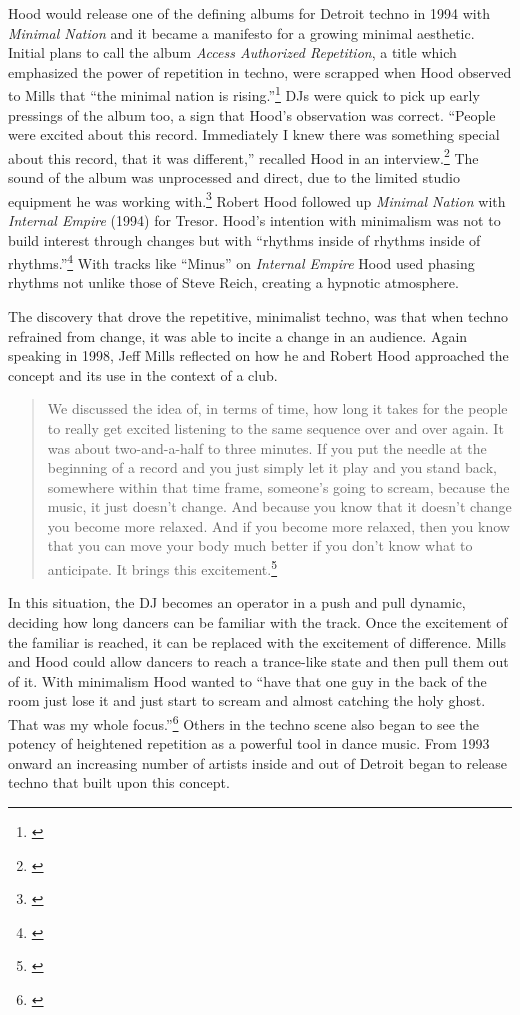 \documentclass[12pt,twoside]{reedthesis}
\begin{document}
Hood would release one of the defining albums for Detroit techno in 1994 with \emph{Minimal Nation} and it became a manifesto for a growing minimal aesthetic. Initial plans to call the album \emph{Access Authorized Repetition}, a title which emphasized the power of repetition in techno, were scrapped when Hood observed to Mills that ``the minimal nation is rising.''\footnote{\cite{holbenMakingMinimalNation2019}} DJs were quick to pick up early pressings of the album too, a sign that Hood's observation was correct. ``People were excited about this record. Immediately I knew there was something special about this record, that it was different,'' recalled Hood in an interview.\footnote{\cite{holbenMakingMinimalNation2019}} The sound of the album was unprocessed and direct, due to the limited studio equipment he was working with.\footnote{\cite{holbenMakingMinimalNation2019}} Robert Hood followed up \emph{Minimal Nation} with \emph{Internal Empire} (1994) for Tresor. Hood's intention with minimalism was not to build interest through changes but with ``rhythms inside of rhythms inside of rhythms.''\footnote{\cite{burnsRobertHoodLecture2014}} With tracks like ``Minus'' on \emph{Internal Empire} Hood used phasing rhythms not unlike those of Steve Reich, creating a hypnotic atmosphere.

The discovery that drove the repetitive, minimalist techno, was that when techno refrained from change, it was able to incite a change in an audience. Again speaking in 1998, Jeff Mills reflected on how he and Robert Hood approached the concept and its use in the context of a club.

\begin{quote}
   We discussed the idea of, in terms of time, how long it takes for the people to really get excited listening to the same sequence over and over again. It was about two-and-a-half to three minutes. If you put the needle at the beginning of a record and you just simply let it play and you stand back, somewhere within that time frame, someone’s going to scream, because the music, it just doesn’t change. And because you know that it doesn’t change you become more relaxed. And if you become more relaxed, then you know that you can move your body much better if you don’t know what to anticipate. It brings this excitement.\footnote{\cite{schmidtJeffMillsLecture1998a}}
\end{quote}

In this situation, the DJ becomes an operator in a push and pull dynamic, deciding how long dancers can be familiar with the track. Once the excitement of the familiar is reached, it can be replaced with the excitement of difference. Mills and Hood could allow dancers to reach a trance-like state and then pull them out of it. With minimalism Hood wanted to ``have that one guy in the back of the room just lose it and just start to scream and almost catching the holy ghost. That was my whole focus.''\footnote{\cite{burnsRobertHoodLecture2014}} Others in the techno scene also began to see the potency of heightened repetition as a powerful tool in dance music. From 1993 onward an increasing number of artists inside and out of Detroit began to release techno that built upon this concept.
\end{document}
